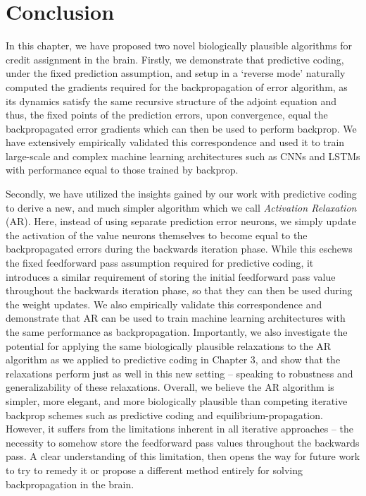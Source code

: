 \section{Conclusion}

In this chapter, we have proposed two novel biologically plausible algorithms for credit assignment in the brain. Firstly, we demonstrate that predictive coding, under the fixed prediction assumption, and setup in a `reverse mode' naturally computed the gradients required for the backpropagation of error algorithm, as its dynamics satisfy the same recursive structure of the adjoint equation and thus, the fixed points of the prediction errors, upon convergence, equal the backpropagated error gradients which can then be used to perform backprop. We have extensively empirically validated this correspondence and used it to train large-scale and complex machine learning architectures such as CNNs and LSTMs with performance equal to those trained by backprop. 

Secondly, we have utilized the insights gained by our work with predictive coding to derive a new, and much simpler algorithm which we call \emph{Activation Relaxation} (AR). Here, instead of using separate prediction error neurons, we simply update the activation of the value neurons themselves to become equal to the backpropagated errors during the backwards iteration phase. While this eschews the fixed feedforward pass assumption required for predictive coding, it introduces a similar requirement of storing the initial feedforward pass value throughout the backwards iteration phase, so that they can then be used during the weight updates. We also empirically validate this correspondence and demonstrate that AR can be used to train machine learning architectures with the same performance as backpropagation. Importantly, we also investigate the potential for applying the same biologically plausible relaxations to the AR algorithm as we applied to predictive coding in Chapter 3, and show that the relaxations perform just as well in this new setting -- speaking to robustness and generalizability of these relaxations. Overall, we believe the AR algorithm is simpler, more elegant, and more biologically plausible than competing iterative backprop schemes such as predictive coding and equilibrium-propagation. However, it suffers from the limitations inherent in all iterative approaches -- the necessity to somehow store the feedforward pass values throughout the backwards pass. A clear understanding of this limitation, then opens the way for future work to try to remedy it or propose a different method entirely for solving backpropagation in the brain.

